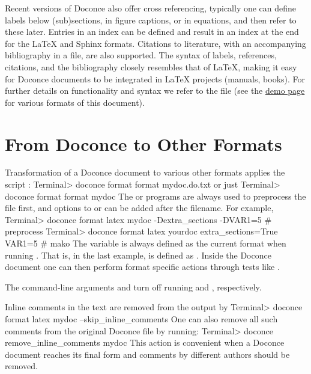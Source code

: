 \documentclass[twoside]{book}
\begin{document}
Recent versions of Doconce also offer cross referencing, typically one
can define labels below (sub)sections, in figure captions, or in
equations, and then refer to these later. Entries in an index can be
defined and result in an index at the end for the {\LaTeX} and Sphinx
formats. Citations to literature, with an accompanying bibliography in
a file, are also supported. The syntax of labels, references,
citations, and the bibliography closely resembles that of {\LaTeX},
making it easy for Doconce documents to be integrated in {\LaTeX}
projects (manuals, books). For further details on functionality and
syntax we refer to the  file (see the
\href{{https://doconce.googlecode.com/hg/doc/demos/manual/index.html}}{demo page}
for various formats of this document).




\section{From Doconce to Other Formats}

\label{doconce2formats}

Transformation of a Doconce document  to various other
formats applies the script :
\bsys
Terminal> doconce format format mydoc.do.txt
\esys
or just
\bsys
Terminal> doconce format format mydoc
\esys
The  or  programs are always used to preprocess the
file first, and options to  or  can be added after the
filename. For example,
\bsys
Terminal> doconce format latex mydoc -Dextra_sections -DVAR1=5     # preprocess
Terminal> doconce format latex yourdoc extra_sections=True VAR1=5  # mako
\esys
The variable  is always defined as the current format when
running . That is, in the last example,  is
defined as . Inside the Doconce document one can then perform
format specific actions through tests like .

The command-line arguments  and  turn off
running  and , respectively.

Inline comments in the text are removed from the output by
\bsys
Terminal> doconce format latex mydoc --skip_inline_comments
\esys
One can also remove all such comments from the original Doconce
file by running:
\bccq
Terminal> doconce remove_inline_comments mydoc
\eccq
This action is convenient when a Doconce document reaches its final form
and comments by different authors should be removed.
\end{document}

